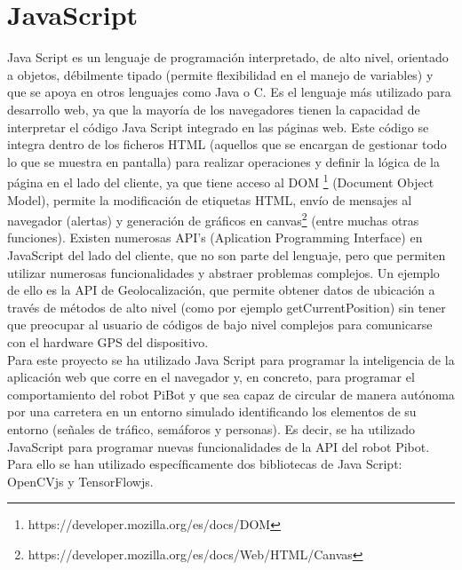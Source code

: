\documentclass{report}
\begin{document}
\newpage
\section{JavaScript}
Java Script es un lenguaje de programación interpretado,  de alto nivel, orientado a objetos, débilmente tipado (permite flexibilidad en el manejo de variables) y que se apoya en otros lenguajes como Java o C. Es el lenguaje más utilizado para desarrollo web, ya que la mayoría de los navegadores tienen la capacidad de interpretar el código Java Script integrado en las páginas web. Este código se integra dentro de los ficheros HTML (aquellos que se encargan de gestionar todo lo que se muestra en pantalla) para realizar operaciones y definir la lógica de la página en el lado del cliente, ya que tiene acceso al DOM \footnote{https://developer.mozilla.org/es/docs/DOM} (Document Object Model),  permite la modificación de etiquetas HTML, envío de mensajes al navegador (alertas) y generación de gráficos en canvas\footnote{https://developer.mozilla.org/es/docs/Web/HTML/Canvas} (entre  muchas otras funciones). Existen numerosas API's (Aplication Programming Interface) en JavaScript del lado del cliente, que no son parte del lenguaje, pero que permiten utilizar numerosas funcionalidades y abstraer problemas complejos. Un ejemplo de ello es la API de Geolocalización, que permite obtener datos de ubicación a través de métodos de alto nivel (como por ejemplo getCurrentPosition) sin tener que preocupar al usuario de códigos de bajo nivel complejos para comunicarse con el hardware GPS del dispositivo. 
\\

Para este proyecto se ha utilizado Java Script para programar la inteligencia de la aplicación web que corre en el navegador y, en concreto, para programar el comportamiento del robot PiBot y que sea capaz de circular de manera autónoma por una carretera en un entorno simulado identificando los elementos de su entorno (señales de tráfico, semáforos y personas). Es decir, se ha utilizado JavaScript para programar nuevas funcionalidades de la API del robot Pibot. Para ello se han utilizado específicamente dos bibliotecas de Java Script: OpenCVjs y TensorFlowjs.
\end{document}
